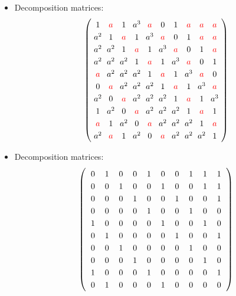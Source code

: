 \documentclass{beamer}
\newcommand{\RR}[1]{\textcolor{red}{#1}}
\begin{document}
\begin{frame}

  \begin{itemize}
  \item Decomposition matrices:
    \[
      \left(
        \arraycolsep=3.0pt\def\arraystretch{1.25}
        \begin{array}{cccccccccc}
          1&\RR{a}&1&a^3&\RR{a}&0&1&\RR{a}&\RR{a}&\RR{a}\\
          a^2&1&\RR{a}&1&a^3&\RR{a}&0&1&\RR{a}&\RR{a}\\
          a^2&a^2&1&\RR{a}&1&a^3&\RR{a}&0&1&\RR{a}\\
          a^2&a^2&a^2&1&\RR{a}&1&a^3&\RR{a}&0&1\\
          \RR{a}&a^2&a^2&a^2&1&\RR{a}&1&a^3&\RR{a}&0\\
          0&\RR{a}&a^2&a^2&a^2&1&\RR{a}&1&a^3&\RR{a}\\
          a^2&0&\RR{a}&a^2&a^2&a^2&1&\RR{a}&1&a^3\\
          1&a^2&0&\RR{a}&a^2&a^2&a^2&1&\RR{a}&1\\
          \RR{a}&1&a^2&0&\RR{a}&a^2&a^2&a^2&1&\RR{a}\\
          a^2&\RR{a}&1&a^2&0&\RR{a}&a^2&a^2&a^2&1\\
        \end{array}
      \right)   
    \]
  \end{itemize}

\end{frame}

\begin{frame}

  \begin{itemize}
  \item Decomposition matrices:
    \[
      \left(
        \arraycolsep=6.0pt\def\arraystretch{1.25}
        \begin{array}{cccccccccc}
          0&1&0&0&1&0&0&1&1&1\\
          0&0&1&0&0&1&0&0&1&1\\
          0&0&0&1&0&0&1&0&0&1\\
          0&0&0&0&1&0&0&1&0&0\\
          1&0&0&0&0&1&0&0&1&0\\
          0&1&0&0&0&0&1&0&0&1\\
          0&0&1&0&0&0&0&1&0&0\\
          0&0&0&1&0&0&0&0&1&0\\
          1&0&0&0&1&0&0&0&0&1\\
          0&1&0&0&0&1&0&0&0&0\\
        \end{array}
      \right)
    \]
  \end{itemize}

\end{frame}
\end{document}
